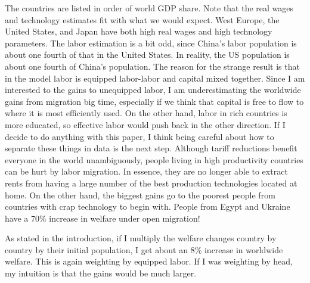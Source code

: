\documentclass{article}
\begin{document}
The countries are listed in order of world GDP share.  Note that the real wages and technology estimates fit with what we would expect.  West Europe, the United States, and Japan have both high real wages and high technology parameters.  The labor estimation is a bit odd, since China's labor population is about one fourth of that in the United States.  In reality, the US population is about one fourth of China's population.  The reason for the strange result is that in the model labor is equipped labor-labor and capital mixed together.  Since I am interested to the gains to unequipped labor, I am underestimating the worldwide gains from migration big time, especially if we think that capital is free to flow to where it is most efficiently used.  On the other hand, labor in rich countries is more educated, so effective labor would push back in the other direction.  If I decide to do anything with this paper, I think being careful about how to separate these things in data is the next step.  Although tariff reductions benefit everyone in the world unambiguously, people living in high productivity countries can be hurt by labor migration.  In essence, they are no longer able to extract rents from having a large number of the best production technologies located at home.  On the other hand, the biggest gains go to the poorest people from countries with crap technology to begin with.  People from Egypt and Ukraine have a 70\% increase in welfare under open migration!

As stated in the introduction, if I multiply the welfare changes country by country by their initial population, I get about an 8\% increase in worldwide welfare.  This is again weighting by equipped labor.  If I was weighting by head, my intuition is that the gains would be much larger.     



\end{document}
